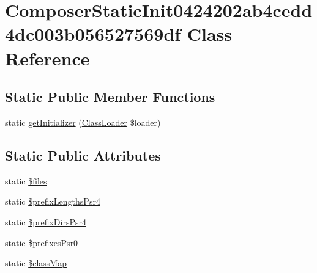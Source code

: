 \hypertarget{class_composer_1_1_autoload_1_1_composer_static_init0424202ab4cedd4dc003b056527569df}{}\section{Composer\+Static\+Init0424202ab4cedd4dc003b056527569df Class Reference}
\label{class_composer_1_1_autoload_1_1_composer_static_init0424202ab4cedd4dc003b056527569df}
\subsection*{Static Public Member Functions}
\begin{DoxyCompactItemize}
\item 
static \mbox{\hyperlink{class_composer_1_1_autoload_1_1_composer_static_init0424202ab4cedd4dc003b056527569df_a43dabec9d94d3a81ef6434b0377bf161}{get\+Initializer}} (\mbox{\hyperlink{class_composer_1_1_autoload_1_1_class_loader}{Class\+Loader}} \$loader)
\end{DoxyCompactItemize}
\subsection*{Static Public Attributes}
\begin{DoxyCompactItemize}
\item 
static \mbox{\hyperlink{class_composer_1_1_autoload_1_1_composer_static_init0424202ab4cedd4dc003b056527569df_a9590b15215a21e9b42eb546aeef79704}{\$files}}
\item 
static \mbox{\hyperlink{class_composer_1_1_autoload_1_1_composer_static_init0424202ab4cedd4dc003b056527569df_a8a73e9adb9ac5eb77041801645646ff3}{\$prefix\+Lengths\+Psr4}}
\item 
static \mbox{\hyperlink{class_composer_1_1_autoload_1_1_composer_static_init0424202ab4cedd4dc003b056527569df_a923378483704151b859f5398efa4cb5b}{\$prefix\+Dirs\+Psr4}}
\item 
static \mbox{\hyperlink{class_composer_1_1_autoload_1_1_composer_static_init0424202ab4cedd4dc003b056527569df_a585a4d160be80e548731fd58b6483a36}{\$prefixes\+Psr0}}
\item 
static \mbox{\hyperlink{class_composer_1_1_autoload_1_1_composer_static_init0424202ab4cedd4dc003b056527569df_adc083f7e1f2dd14ca2ddbaa63c2faf46}{\$class\+Map}}
\end{DoxyCompactItemize}


